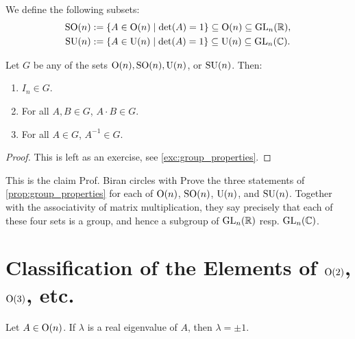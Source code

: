 \begin{definition}
\label{def:special_groups}
We define the following subsets:
\begin{align*}
    \operatorname{SO}(n) &:= \{ A \in \operatorname{O}(n) \mid \det(A) = 1 \} \subseteq \operatorname{O}(n) \subseteq \operatorname{GL}_n(\mathbb{R}), \\
    \operatorname{SU}(n) &:= \{ A \in \operatorname{U}(n) \mid \det(A) = 1 \} \subseteq \operatorname{U}(n) \subseteq \operatorname{GL}_n(\mathbb{C}).
\end{align*}
\end{definition}

\begin{proposition}
\label{prop:group_properties}
Let $G$ be any of the sets $\operatorname{O}(n), \operatorname{SO}(n), \operatorname{U}(n)$, or $\operatorname{SU}(n)$. Then:
\begin{enumerate}
    \item $I_n \in G$.
    \item For all $A, B \in G$, $A \cdot B \in G$.
    \item For all $A \in G$, $A^{-1} \in G$.
\end{enumerate}
\end{proposition}

\begin{proof}
This is left as an exercise, see \cref{exc:group_properties}.
\end{proof}

\begin{exercise}
\label{exc:group_properties}
This is the claim Prof. Biran circles with  Prove the three statements of \cref{prop:group_properties} for each of $\operatorname{O}(n)$, $\operatorname{SO}(n)$, $\operatorname{U}(n)$, and $\operatorname{SU}(n)$. Together with the associativity of matrix multiplication, they say precisely that each of these four sets is a group, and hence a subgroup of $\operatorname{GL}_n(\mathbb{R})$ resp. $\operatorname{GL}_n(\mathbb{C})$.
\end{exercise}

\section{Classification of the Elements of \texorpdfstring{$\operatorname{O}(2)$, $\operatorname{O}(3)$}{O(2), O(3)}, etc.}

\begin{lemma}
\label{lem:eigenvalues_orthogonal}
Let $A \in \operatorname{O}(n)$. If $\lambda$ is a real eigenvalue of $A$, then $\lambda = \pm 1$.
\end{lemma}

